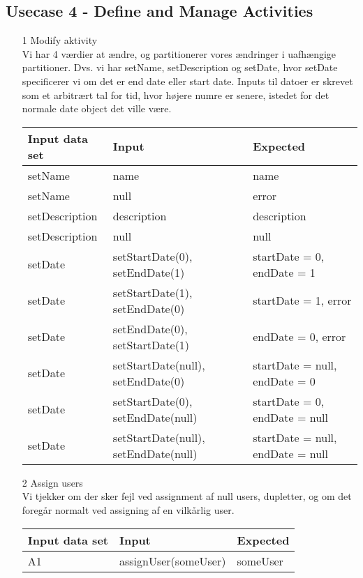 \documentclass[a4paper,12pt]{article}
\begin{document}
\subsection{Usecase 4 - Define and Manage Activities}
\begin{enumerate}
	\item[1] Modify aktivity\\
		Vi har 4 værdier at ændre, og partitionerer vores ændringer i uafhængige partitioner. Dvs. vi har setName, setDescription og setDate, hvor setDate specificerer vi om det er end date eller start date. Inputs til datoer er skrevet som et arbitrært tal for tid, hvor højere numre er senere, istedet for det normale date object det ville være.
		\begin{center}
		\begin{tabular}{|l|l|l|}
			\hline
			Input data set & Input & Expected \\
			\hline
			setName & name & name \\
			setName & null & error \\
			setDescription & description & description \\
			setDescription & null & null \\
			setDate & setStartDate(0), setEndDate(1) & startDate = 0, endDate = 1 \\
			setDate & setStartDate(1), setEndDate(0) & startDate = 1, error \\
			setDate & setEndDate(0), setStartDate(1) & endDate = 0, error \\
			setDate & setStartDate(null), setEndDate(0) & startDate = null, endDate = 0 \\
			setDate & setStartDate(0), setEndDate(null) & startDate = 0, endDate = null \\
			setDate & setStartDate(null), setEndDate(null) & startDate = null, endDate = null \\
			\hline
		\end{tabular}
		\end{center}
	\item[2] Assign users\\
		Vi tjekker om der sker fejl ved assignment af null users, dupletter, og om det foregår normalt ved assigning af en vilkårlig user.
			\begin{center}
			\begin{tabular}{|l|l|l|}
				\hline
				Input data set & Input & Expected \\
				\hline
				A1 & assignUser(someUser) & someUser \\

\end{tabular}
\end{center}
\end{enumerate}
\end{document}
